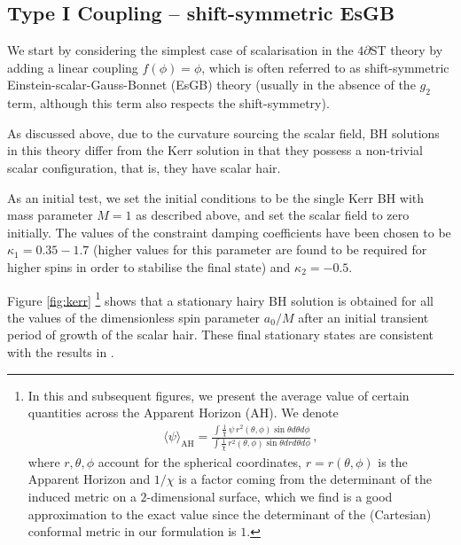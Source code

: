 \documentclass[reprint,aps,amsmath,amssymb,twoside,prd,showkeys,superscriptaddress,nofootinbib]{revtex4-2}
\begin{document}
\subsection{Type I Coupling -- shift-symmetric EsGB}

We start by considering the simplest case of scalarisation in the $4\partial$ST theory by adding a linear coupling $f(\phi)=\phi$, which is often referred to as shift-symmetric Einstein-scalar-Gauss-Bonnet (EsGB) theory (usually in the absence of the $g_2$ term, although this term also respects the shift-symmetry). 

As discussed above, due to the curvature sourcing the scalar field, BH solutions in this theory differ from the Kerr solution in that they possess a non-trivial scalar configuration, that is, they have scalar hair.

As an initial test, we set the initial conditions to be the single Kerr BH with mass parameter $M=1$ as described above, and set the scalar field to zero initially. The values of the constraint damping coefficients have been chosen to be $\kappa_1=0.35-1.7$ (higher values for this parameter are found to be required for higher spins in order to stabilise the final state) and $\kappa_2=-0.5$. 

Figure \ref{fig:kerr} \footnote{In this and subsequent figures, we present the average value of certain quantities across the Apparent Horizon (AH). We denote 
\begin{eqnarray}
    \langle\psi\rangle_{\text{AH}}=\tfrac{\int\tfrac{1}{\chi}\,\psi\,r^2(\theta,\phi)\sin\theta d\theta d\phi}{\int\tfrac{1}{\chi}\,r^2(\theta,\phi)\sin\theta drd\theta d\phi}\,,
\end{eqnarray}
where $r,\theta,\phi$ account for the spherical coordinates, $r=r(\theta,\phi)$ is the Apparent Horizon and $1/\chi$ is a factor coming from the determinant of the induced metric on a $2$-dimensional surface, which we find is a good approximation to the exact value since the determinant of the (Cartesian) conformal metric in our formulation is $1$.} shows that a stationary hairy BH solution is obtained for all the values of the dimensionless spin parameter $a_0/M$ after an initial transient period of growth of the scalar hair. These final stationary states are consistent with the results in \cite{East:2020hgw}.
\end{document}
